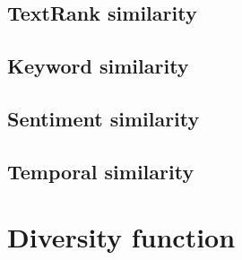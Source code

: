 \subsection{TextRank similarity}

\subsection{Keyword similarity}

\subsection{Sentiment similarity}

\subsection{Temporal similarity}


\section{Diversity function}